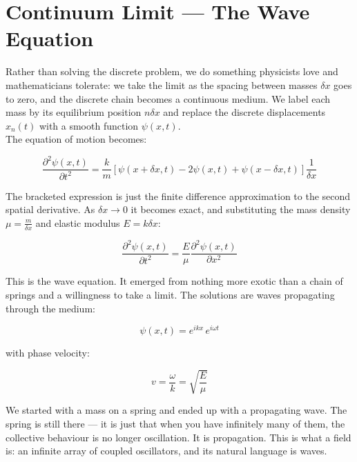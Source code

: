 \documentclass[krantz1,ChapterTOCs]{krantz}
\begin{document}
\section*{Continuum Limit --- The Wave Equation}

Rather than solving the discrete problem, we do something physicists 
love and mathematicians tolerate: we take the limit as the spacing 
between masses $\delta x$ goes to zero, and the discrete chain becomes 
a continuous medium. We label each mass by its equilibrium position 
$n\delta x$ and replace the discrete displacements $x_n(t)$ with a 
smooth function $\psi(x, t)$.\\

The equation of motion becomes:

\begin{equation}
\frac{\partial^2 \psi(x,t)}{\partial t^2} = \frac{k}{m} \left[ 
\psi(x+\delta x,t) - 2\psi(x,t) + \psi(x - \delta x, t) \right] 
\frac{1}{\delta x}
\end{equation}

The bracketed expression is just the finite difference approximation 
to the second spatial derivative. As $\delta x \to 0$ it becomes exact, 
and substituting the mass density $\mu = \frac{m}{\delta x}$ and 
elastic modulus $E = k\delta x$:

\begin{equation}
\frac{\partial^2 \psi(x,t)}{\partial t^2} = \frac{E}{\mu} 
\frac{\partial^2 \psi(x,t)}{\partial x^2}
\end{equation}

This is the wave equation. It emerged from nothing more exotic than a 
chain of springs and a willingness to take a limit. The solutions are 
waves propagating through the medium:

\begin{equation}
\psi(x,t) = e^{ikx}\, e^{i\omega t}
\end{equation}

with phase velocity:

\begin{equation}
v = \frac{\omega}{k} = \sqrt{\frac{E}{\mu}}
\end{equation}

We started with a mass on a spring and ended up with a propagating 
wave. The spring is still there --- it is just that when you have 
infinitely many of them, the collective behaviour is no longer 
oscillation. It is propagation. This is what a field is: an infinite 
array of coupled oscillators, and its natural language is waves.\\
\end{document}
